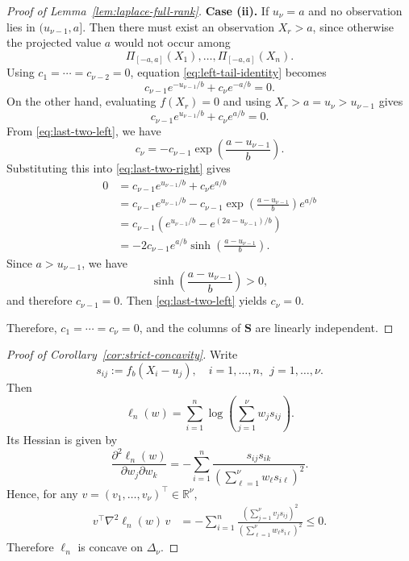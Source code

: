 \documentclass[english, 11pt]{article}
\theoremstyle{plain}
\theoremstyle{definition}
\theoremstyle{remark}
\begin{document}
\begin{appendix}
\begin{proof}[Proof of Lemma~\ref{lem:laplace-full-rank}]
\textbf{Case (ii).} If $u_\nu=a$ and no observation lies in $(u_{\nu-1},a]$. Then there must exist an observation $X_r>a$, since otherwise the projected value $a$ would not occur among
\begin{equation*}
\Pi_{[-a,a]}(X_1),\dots,\Pi_{[-a,a]}(X_n).
\end{equation*}
Using $c_1=\cdots=c_{\nu-2}=0$, equation \eqref{eq:left-tail-identity} becomes
\begin{equation}\label{eq:last-two-left}
c_{\nu-1}e^{-u_{\nu-1}/b}+c_\nu e^{-a/b}=0.
\end{equation}
On the other hand, evaluating $f(X_r)=0$ and using $X_r>a=u_\nu>u_{\nu-1}$ gives
\begin{equation}\label{eq:last-two-right}
c_{\nu-1}e^{u_{\nu-1}/b}+c_\nu e^{a/b}=0.
\end{equation}
From \eqref{eq:last-two-left}, we have
\begin{equation*}
c_\nu=-c_{\nu-1}\exp\left(\frac{a-u_{\nu-1}}{b}\right).
\end{equation*}
Substituting this into \eqref{eq:last-two-right} gives
\begin{align*}
0&=c_{\nu-1}e^{u_{\nu-1}/b}+c_\nu e^{a/b} \\
&=c_{\nu-1}e^{u_{\nu-1}/b}-c_{\nu-1}\exp\left(\frac{a-u_{\nu-1}}{b}\right)e^{a/b} \\
&=c_{\nu-1}\left(e^{u_{\nu-1}/b}-e^{(2a-u_{\nu-1})/b}\right) \\
&=-2c_{\nu-1}e^{a/b}\sinh\left(\frac{a-u_{\nu-1}}{b}\right).
\end{align*}
Since $a>u_{\nu-1}$, we have
\begin{equation*}
\sinh\left(\frac{a-u_{\nu-1}}{b}\right)>0,
\end{equation*}
and therefore $c_{\nu-1}=0$. Then \eqref{eq:last-two-left} yields $c_\nu=0$.

Therefore, $c_1=\cdots=c_\nu=0$, and the columns of $\mathbf S$ are linearly independent.
\end{proof}

\restatestrictconcavity*
\begin{proof}[Proof of Corollary~\ref{cor:strict-concavity}]
Write
\begin{equation*}
s_{ij}:=f_b(X_i-u_j), \quad i=1,\dots,n,\ \ j=1,\dots,\nu.
\end{equation*}
Then
\begin{equation*}
\ell_n(w)=\sum_{i=1}^n \log \left(\sum_{j=1}^{\nu} w_j s_{ij}\right).
\end{equation*}
Its Hessian is given by
\begin{equation*}
\frac{\partial^2 \ell_n(w)}{\partial w_j\partial w_k}=-\sum_{i=1}^n\frac{s_{ij}s_{ik}}{\left(\sum_{\ell=1}^\nu w_\ell s_{i\ell}\right)^2}.
\end{equation*}
Hence, for any $v=(v_1,\dots,v_\nu)^\top\in\mathbb R^\nu$,
\begin{align*}
v^\top \nabla^2 \ell_n(w)\, v
&=-\sum_{i=1}^n\frac{\left(\sum_{j=1}^\nu v_j s_{ij}\right)^2}{\left(\sum_{\ell=1}^\nu w_\ell s_{i\ell}\right)^2}\le 0.
\end{align*}
Therefore $\ell_n$ is concave on $\Delta_\nu$.


\end{proof}
\end{appendix}
\end{document}

